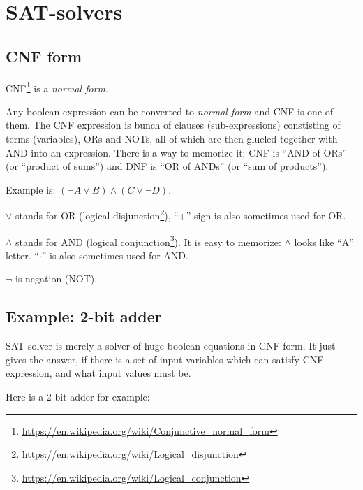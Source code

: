 \section{SAT-solvers}

\subsection{CNF form}

\ac{CNF}\footnote{\url{https://en.wikipedia.org/wiki/Conjunctive_normal_form}} is a \textit{normal form}.


Any boolean expression can be converted to \textit{normal form} and \ac{CNF} is one of them.
The \ac{CNF} expression is bunch of clauses (sub-expressions) constisting of terms (variables), ORs and NOTs, 
all of which are then glueled together with AND into an expression.
There is a way to memorize it: \ac{CNF} is ``AND of ORs'' (or ``product of sums'') and \ac{DNF} is ``OR of ANDs'' (or ``sum of products'').

Example is: $(\neg A \vee B) \wedge (C \vee \neg D)$.

$\vee$ stands for OR (logical disjunction\footnote{\url{https://en.wikipedia.org/wiki/Logical_disjunction}}), 
``+'' sign is also sometimes used for OR.

$\wedge$ stands for AND (logical conjunction\footnote{\url{https://en.wikipedia.org/wiki/Logical_conjunction}}).
It is easy to memorize: $\wedge$ looks like ``A'' letter.
``$\cdot$'' is also sometimes used for AND.

$\neg$ is negation (NOT).


\subsection{Example: 2-bit adder}
\label{adder}

SAT-solver is merely a solver of huge boolean equations in CNF form.
It just gives the answer, if there is a set of input variables which can satisfy CNF expression, and what input values must be.

Here is a 2-bit adder for example:

